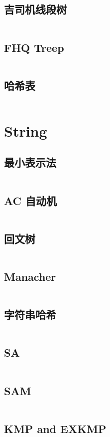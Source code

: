 \documentclass[titlepage, a4paper]{article}
\begin{document}
\begin{multicols}{2}
\begin{spacing}{0.6}
				\subsection{吉司机线段树}
					\inputminted{cpp}{src/DataStructure/seg-tree.cpp}
				\subsection{FHQ Treep}
					\inputminted{cpp}{src/DataStructure/fhq-treap.cpp}
				\subsection{哈希表}
					\inputminted{cpp}{src/DataStructure/hashmap.cpp}

			\section{String}
				\subsection{最小表示法}
					\inputminted{cpp}{src/String/最小表示法.cpp}
				\subsection{AC 自动机}
					\inputminted{cpp}{src/String/ACAM.cpp}
				\subsection{回文树}
					\inputminted{cpp}{src/String/PAM.cpp}
				\subsection{Manacher}
					\inputminted{cpp}{src/String/Manacher.cpp}
				\subsection{字符串哈希}
					\inputminted{cpp}{src/String/MultipleHash.cpp}
				\subsection{SA}
					\inputminted{cpp}{src/String/SA.cpp}
				\subsection{SAM}
					\inputminted{cpp}{src/String/SAM.cpp}
				\subsection{KMP and EXKMP}
					\inputminted{cpp}{src/String/KMPexKMP.cpp}

\end{spacing}
\end{multicols}
\end{document}
